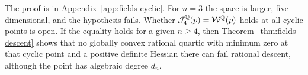 The proof is in Appendix~\ref{app:fields-cyclic}. For $n=3$ the space is
larger, five-dimensional, and the hypothesis fails. Whether
$\mathcal J_4^\mathbb Q(p)=\mathcal W^\mathbb Q(p)$ holds at all cyclic points is open.
If the equality holds for a given $n\ge4$, then
Theorem~\ref{thm:fields-descent} shows that no globally convex rational
quartic with minimum zero at that cyclic point and a positive definite
Hessian there can fail rational
descent, although the point has algebraic degree $d_n$.
